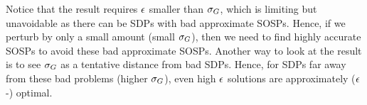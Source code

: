 Notice that the result requires $\epsilon$ smaller than $\sigma_G$, which is limiting but unavoidable as there can be SDPs with bad approximate SOSPs. Hence, if we perturb by only a small amount (small $\sigma_G$), then we need to find highly accurate SOSPs to avoid these bad approximate SOSPs. Another way to look at the result is to see $\sigma_G$ as a tentative distance from bad SDPs. Hence, for SDPs far away from these bad problems (higher $\sigma_G$), even high $\epsilon$ solutions are approximately ($\epsilon$-) optimal.
